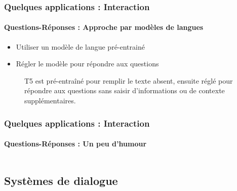 \documentclass[xcolor=table]{beamer}
\begin{document}
\begin{frame}
	\frametitle{Quelques applications : Interaction}
	\framesubtitle{Questions-Réponses : Approche par modèles de langues}
	
	\begin{itemize}
		\item Utiliser un modèle de langue pré-entrainé
		\item Régler le modèle pour répondre aux questions
	\end{itemize}

	\begin{figure}
		\centering
		\caption{T5 est pré-entraîné pour remplir le texte absent, ensuite réglé pour répondre aux questions sans saisir d'informations ou de contexte supplémentaires. \cite{2020-roberts-al}}
	\end{figure}
	
\end{frame}

\begin{frame}
	\frametitle{Quelques applications : Interaction}
	\framesubtitle{Questions-Réponses : Un peu d'humour}
	
	\begin{columns}
		\begin{column}{0.3\textwidth}
			
		\end{column}
		\begin{column}{0.4\textwidth}
		\end{column}
	\end{columns}

\end{frame}

\subsection{Systèmes de dialogue}
\end{document}
